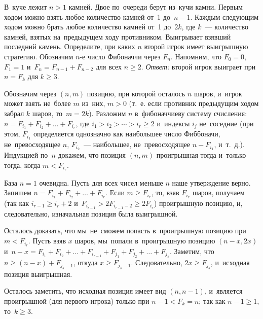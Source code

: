 \problem{}
В~куче лежит $n > 1$ камней.
Двое по~очереди берут из~кучи камни.
Первым ходом можно взять любое количество камней от~1 до~$n-1$.
Каждым следующим ходом можно брать любое количество камней от~1 до~$2 k$, где
$k$~--- количество камней, взятых на~предыдущем ходу противником.
Выигрывает взявший последний камень.
Определите, при каких $n$ второй игрок имеет выигрышную стратегию.
\solution
Обозначим $n$-е число Фибоначчи через $F_n$.
Напомним, что $F_0 = 0$, $F_1 = 1$ и~$F_n = F_{n-1} + F_{n-2}$ для всех
$n \geq 2$.
\emph{Ответ:} второй игрок выиграет при $n = F_k$ для $k \geq 3$.
\par
Обозначим через $(n, m)$ позицию, при которой осталось $n$ шаров, и~игрок может
взять не~более $m$ из~них, $m > 0$
(т.~е. если противник предыдущим ходом забрал $k$ шаров, то~$m = 2 k$).
Разложим $n$ в~фибоначчиеву систему счисления:
$n = F_{i_1} + F_{i_2} + \ldots + F_{i_r}$,
где $i_1 > i_2 > \cdots > i_r \geq 2$ и~индексы $i_j$ не~соседние
(при этом, $F_{i_1}$ определяется однозначно как наибольшее число Фиббоначи,
не~превосходящее $n$, $F_{i_2}$~--- наибольшее, не~превосходящее $n - F_{i_1}$,
и~т.~д.).
Индукцией по~$n$ докажем, что позиция $(n, m)$ проигрышная тогда и~только
тогда, когда $m < F_{i_r}$.
\par
База $n = 1$ очевидна.
Пусть для всех чисел меньше $n$ наше утверждение верно.
Запишем $n = F_{i_1} + F_{i_2} + \ldots + F_{i_r}$.
Если $m \geq F_{i_r}$, то, взяв $F_{i_r}$ шаров, получаем
(так как $i_{r-1} \geq i_r + 2$
и~$F_{i_{r-1}} > 2 F_{i_{r-1}-2} \geq 2 F_{i_r}$)
проигрышную позицию, и, следовательно, изначальная позиция была выигрышной.
\par
Осталось доказать, что мы~не~сможем попасть в~проигрышную позицию при
$m < F_{i_r}$.
Пусть взяв $x$ шаров, мы~попали в~проигрышную позицию $(n-x, 2 x)$
и~\(
    n - x
=
    F_{i_1} + F_{i_2} + \ldots + F_{i_{r-1}} +
    F_{j_1} + F_{j_2} + \ldots + F_{j_s}
\).
Заметим, что $n \geq (n - x) + F_{j_s-1}$, откуда $x \geq F_{j_s-1}$.
Следовательно, $2 x \geq F_{j_s}$, и~исходная позиция выигрышная.
\par
Осталось заметить, что исходная позиция имеет вид $(n, n-1)$, и~является
проигрышной (для первого игрока) только при $n - 1 < F_k = n$;
так как $n - 1 \geq 1$, то~$k \geq 3$.
\endproblem

